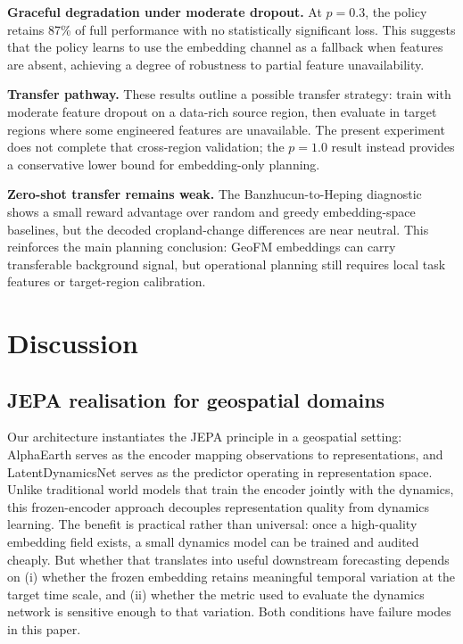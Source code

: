 \documentclass{article}
\begin{document}
\textbf{Graceful degradation under moderate dropout.} At $p=0.3$, the policy retains 87\% of full performance with no statistically significant loss. This suggests that the policy learns to use the embedding channel as a fallback when features are absent, achieving a degree of robustness to partial feature unavailability.

\textbf{Transfer pathway.} These results outline a possible transfer strategy: train with moderate feature dropout on a data-rich source region, then evaluate in target regions where some engineered features are unavailable. The present experiment does not complete that cross-region validation; the $p=1.0$ result instead provides a conservative lower bound for embedding-only planning.

\textbf{Zero-shot transfer remains weak.} The Banzhucun-to-Heping diagnostic shows a small reward advantage over random and greedy embedding-space baselines, but the decoded cropland-change differences are near neutral. This reinforces the main planning conclusion: GeoFM embeddings can carry transferable background signal, but operational planning still requires local task features or target-region calibration.



\section{Discussion}
\label{sec:discussion}

\subsection{JEPA realisation for geospatial domains}

Our architecture instantiates the JEPA principle in a geospatial setting: AlphaEarth serves as the encoder mapping observations to representations, and LatentDynamicsNet serves as the predictor operating in representation space. Unlike traditional world models that train the encoder jointly with the dynamics, this frozen-encoder approach decouples representation quality from dynamics learning. The benefit is practical rather than universal: once a high-quality embedding field exists, a small dynamics model can be trained and audited cheaply. But whether that translates into useful downstream forecasting depends on (i) whether the frozen embedding retains meaningful temporal variation at the target time scale, and (ii) whether the metric used to evaluate the dynamics network is sensitive enough to that variation. Both conditions have failure modes in this paper.
\end{document}
